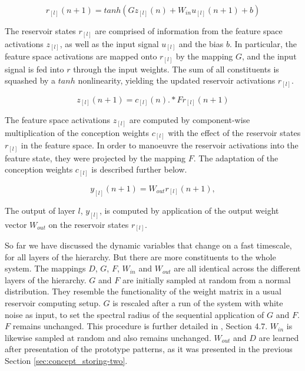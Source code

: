 \documentclass[utf8]{frontiersSCNS} %
\begin{document}
    \begin{equation}
    r_{[l]} (n + 1) =  tanh(G z_{[l]} (n) + W_{in} u_{[l]} (n + 1) + b)
    \end{equation}
    
    The reservoir states $ r_{[l]} $ are comprised of information from the feature space activations $z_{[l]}$, as well as the input signal $u_{[l]}$ and the bias $b$. In particular, the feature space activations are mapped onto $ r_{[l]} $ by the mapping $G$, and the input signal is fed into $r$ through the input weights. The sum of all constituents is squashed by a $tanh$ nonlinearity, yielding the updated reservoir activations $r_{[l]}$. 
    
    \begin{equation}
    z_{[l]} (n + 1) =   c_{[l]} (n) .* F r_{[l]} (n + 1)
    \end{equation}
    
    The feature space activations $z_{[l]}$ are computed by component-wise multiplication of the conception weights $c_{[l]}$ with the effect of the reservoir states $r_{[l]}$ in the feature space. In order to manoeuvre the reservoir activations into the feature state, they were projected by the mapping $F$. The adaptation of the conception weights $c_{[l]}$ is described further below. 
    
    \begin{equation}
    y_{[l]} (n + 1) =     W_{out} r_{[l]} (n + 1),
    \end{equation}
    
    The output of layer $l$, $y_{[l]}$, is computed by application of the output weight vector $W_{out}$ on the reservoir states $r_{[l]}$.
    
    So far we have discussed the dynamic variables that change on a fast timescale, for all layers of the hierarchy. 
    But there are more constituents to the whole system. The mappings $D$, $G$, $F$, $W_{in}$ and $W_{out}$ are all identical 
    across the different layers of the hierarchy. $G$ and $F$ are initially sampled at random from a normal distribution. 
    They resemble the functionality of the weight matrix in a usual reservoir computing setup. $G$ is rescaled after a run of 
    the system with white noise as input, to set the spectral radius of the sequential application of $G$ and $F$. $F$ remains unchanged. 
    This procedure is further detailed in \cite{Jaeger2014}, Section 4.7. $W_{in}$ is likewise sampled at random and also remains unchanged.
    $W_{out}$ and $D$ are learned after presentation of the prototype patterns, as it was presented in the previous Section \ref{sec:concept_storing-two}.
    
\end{document}
